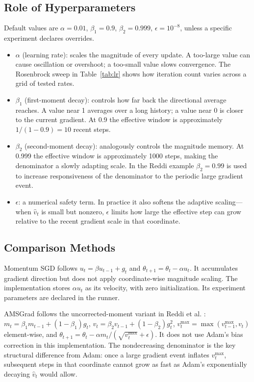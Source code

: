 ﻿\documentclass[conference]{IEEEtran}
\begin{document}
\subsection{Role of Hyperparameters}
Default values are $\alpha=0.01$, $\beta_1=0.9$, $\beta_2=0.999$, $\epsilon=10^{-8}$, unless a specific experiment declares overrides.
\begin{itemize}
  \item $\alpha$ (learning rate): scales the magnitude of every update. A too-large value can cause oscillation or overshoot; a too-small value slows convergence. The Rosenbrock sweep in Table~\ref{tab:lr} shows how iteration count varies across a grid of tested rates.
  \item $\beta_1$ (first-moment decay): controls how far back the directional average reaches. A value near 1 averages over a long history; a value near 0 is closer to the current gradient. At 0.9 the effective window is approximately $1/(1-0.9)=10$ recent steps.
  \item $\beta_2$ (second-moment decay): analogously controls the magnitude memory. At 0.999 the effective window is approximately 1000 steps, making the denominator a slowly adapting scale. In the Reddi example $\beta_2=0.99$ is used to increase responsiveness of the denominator to the periodic large gradient event.
  \item $\epsilon$: a numerical safety term. In practice it also softens the adaptive scaling---when $\hat{v}_t$ is small but nonzero, $\epsilon$ limits how large the effective step can grow relative to the recent gradient scale in that coordinate.
\end{itemize}

\subsection{Comparison Methods}
Momentum SGD follows $u_t=\beta u_{t-1}+g_t$ and $\theta_{t+1}=\theta_t-\alpha u_t$. It accumulates gradient direction but does not apply coordinate-wise magnitude scaling. The implementation stores $\alpha u_t$ as its velocity, with zero initialization. Its experiment parameters are declared in the runner.

AMSGrad follows the uncorrected-moment variant in Reddi et al. \cite{reddi}: $m_t=\beta_1 m_{t-1}+(1-\beta_1)g_t$, $v_t=\beta_2 v_{t-1}+(1-\beta_2)g_t^2$, $v_t^{\max}=\max(v_{t-1}^{\max},v_t)$ element-wise, and $\theta_{t+1}=\theta_t-\alpha m_t/(\sqrt{v_t^{\max}}+\epsilon)$. It does not use Adam's bias correction in this implementation. The nondecreasing denominator is the key structural difference from Adam: once a large gradient event inflates $v_t^{\max}$, subsequent steps in that coordinate cannot grow as fast as Adam's exponentially decaying $\hat{v}_t$ would allow.
\end{document}
